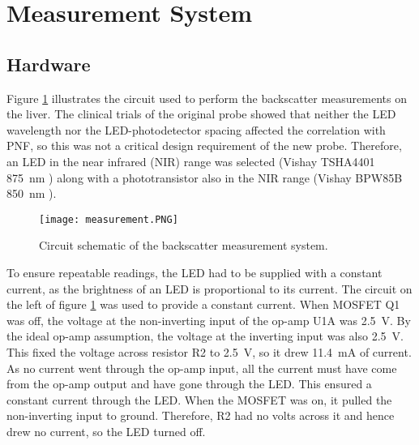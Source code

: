 \section{Measurement System}
\subsection{Hardware}
Figure \ref{fig: measurement schematic} illustrates the circuit used to perform the backscatter measurements on the liver. The clinical trials of the original probe showed that neither the LED wavelength nor the LED-photodetector spacing affected the correlation with PNF, so this was not a critical design requirement of the new probe. Therefore, an LED in the near infrared (NIR) range was selected (Vishay TSHA4401 \SI{875}{\nano\metre} \cite{tsha4401}) along with a phototransistor also in the NIR range (Vishay BPW85B \SI{850}{\nano\metre} \cite{bpw85b}).\\

\begin{figure}[ht]
	\centering
	\texttt{[image: measurement.PNG]}
	\caption{Circuit schematic of the backscatter measurement system.}
	\label{fig: measurement schematic}
\end{figure}

To ensure repeatable readings, the LED had to be supplied with a constant current, as the brightness of an LED is proportional to its current. The circuit on the left of figure \ref{fig: measurement schematic} was used to provide a constant current. When MOSFET Q1 was off, the voltage at the non-inverting input of the op-amp U1A was \SI{2.5}{\volt}. By the ideal op-amp assumption, the voltage at the inverting input was also \SI{2.5}{\volt}. This fixed the voltage across resistor R2 to \SI{2.5}{\volt}, so it drew \SI{11.4}{\milli\ampere} of current. As no current went through the op-amp input, all the current must have come from the op-amp output and have gone through the LED.  This ensured a constant current through the LED. When the MOSFET was on, it pulled the non-inverting input to ground. Therefore, R2 had no volts across it and hence drew no current, so the LED turned off.\\


